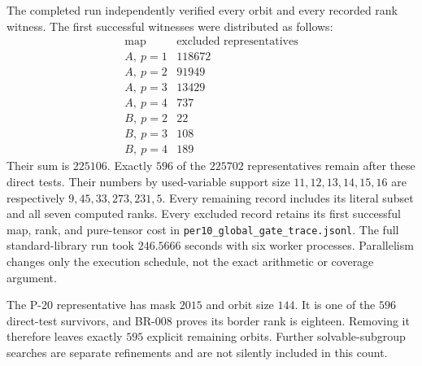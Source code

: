 The completed run independently verified every orbit and every
recorded rank witness.  The first successful witnesses were distributed
as follows:
\[
\begin{array}{c|r}
\text{map}&\text{excluded representatives}\\\hline
 A,\ p=1&118672\\
 A,\ p=2&91949\\
 A,\ p=3&13429\\
 A,\ p=4&737\\
 B,\ p=2&22\\
 B,\ p=3&108\\
 B,\ p=4&189
\end{array}
\]
Their sum is $225106$.  Exactly $596$ of the $225702$ representatives
remain after these direct tests.  Their numbers by used-variable
support size $11,12,13,14,15,16$ are respectively
$9,45,33,273,231,5$.  Every remaining record includes its literal
subset and all seven computed ranks.  Every excluded record retains
its first successful map, rank, and pure-tensor cost in
\texttt{per10\_global\_gate\_trace.jsonl}.
The full standard-library run took $246.5666$ seconds with six worker
processes.  Parallelism changes only the execution schedule, not the
exact arithmetic or coverage argument.

The P-20 representative has mask $2015$ and orbit size $144$.  It is
one of the $596$ direct-test survivors, and BR-008 proves its border
rank is eighteen.  Removing it therefore leaves exactly $595$
explicit remaining orbits.  Further solvable-subgroup searches are
separate refinements and are not silently included in this count.
